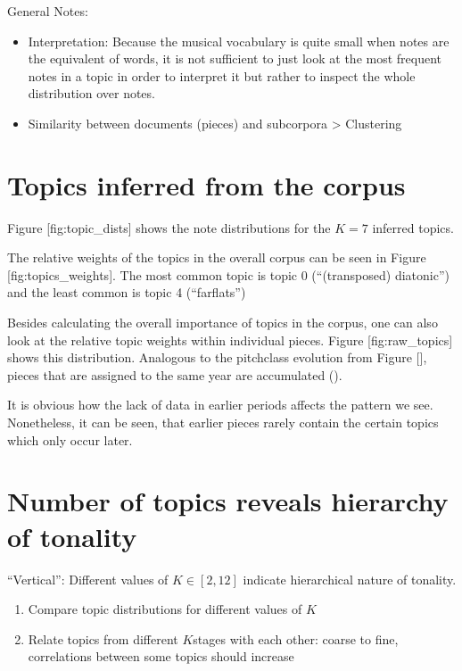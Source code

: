 \documentclass[letterpaper,10pt,english]{sphinxmanual}
\begin{document}
\sphinxAtStartPar
General Notes:
\begin{itemize}
\item {} 
\sphinxAtStartPar
Interpretation: Because the musical vocabulary is quite small when
notes are the equivalent of words, it is not sufficient to just look
at the most frequent notes in a topic in order to interpret it but
rather to inspect the whole distribution over notes.

\item {} 
\sphinxAtStartPar
Similarity between documents (pieces) and subcorpora \textendash{}\textgreater{} Clustering

\end{itemize}


\section{Topics inferred from the corpus}
\label{\detokenize{5_notes:topics-inferred-from-the-corpus}}
\sphinxAtStartPar
Figure {[}fig:topic\_dists{]} shows the note distributions for the
\(K=7\) inferred topics.

\sphinxAtStartPar
The relative weights of the topics in the overall corpus can be seen in
Figure {[}fig:topics\_weights{]}. The most common topic is topic 0
(“(transposed) diatonic”) and the least common is topic 4 (“far\sphinxhyphen{}flats”)

\sphinxAtStartPar
Besides calculating the overall importance of topics in the corpus, one
can also look at the relative topic weights within individual pieces.
Figure {[}fig:raw\_topics{]} shows this distribution. Analogous to the
pitch\sphinxhyphen{}class evolution from Figure {[}{]}, pieces that are assigned to the
same year are accumulated ().

\sphinxAtStartPar
It is obvious how the lack of data in earlier periods affects the
pattern we see. Nonetheless, it can be seen, that earlier pieces rarely
contain the certain topics which only occur later.


\section{Number of topics reveals hierarchy of tonality}
\label{\detokenize{5_notes:number-of-topics-reveals-hierarchy-of-tonality}}
\sphinxAtStartPar
“Vertical”: Different values of \(K\in [2,12]\) indicate
hierarchical nature of tonality.
\begin{enumerate}
%
\item {} 
\sphinxAtStartPar
Compare topic distributions for different values of \(K\)

\item {} 
\sphinxAtStartPar
Relate topics from different \(K\)\sphinxhyphen{}stages with each other: coarse
to fine, correlations between some topics should increase

\end{enumerate}
\end{document}
